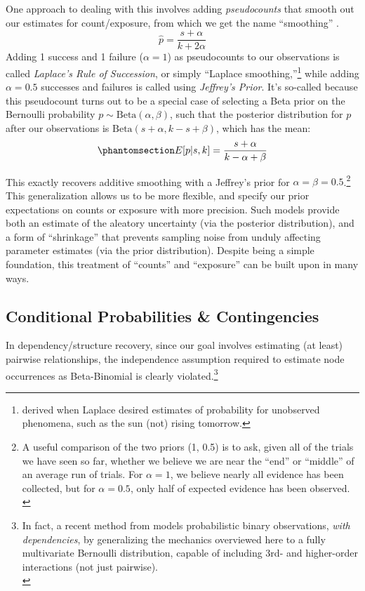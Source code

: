 \documentclass[%
	12pt,
		oneside,
		letterpaper
]{book}
\begin{document}
One approach to dealing with this involves adding \emph{pseudocounts} that smooth out our estimates for count/exposure, from which we get the name ``smoothing'' \autocite[45-53]{SpeechLanguageProcessing_Jurafsky2025}.
\[\hat{p} = \frac{s+\alpha}{k+2\alpha} \]
Adding 1 success and 1 failure (\(\alpha=1\)) as pseudocounts to our observations is called \emph{Laplace's Rule of Succession}, or simply ``Laplace smoothing,''\footnote{
  derived when Laplace desired estimates of probability for unobserved phenomena, such as the sun (not) rising tomorrow.} while adding \(\alpha=0.5\) successes and failures is called using \emph{Jeffrey's Prior}.
It's so-called because this pseudocount turns out to be a special case of selecting a Beta prior on the Bernoulli probability \(p\sim \textrm{Beta}(\alpha, \beta)\), such that the posterior distribution for \(p\) after our observations is \(\textrm{Beta}(s+\alpha, k-s+\beta)\), which has the mean:
\begin{equation}\phantomsection\label{eq-beta-binomial}{
E[p|s,k]=\frac{s+\alpha}{k-\alpha+\beta}
}\end{equation}

This exactly recovers additive smoothing with a Jeffrey's prior for \(\alpha=\beta=0.5\).\footnote{
  A useful comparison of the two priors (1, 0.5) is to ask, given all of the trials we have seen so far, whether we believe we are near the ``end'' or ``middle'' of an average run of trials.
  For \(\alpha=1\), we believe nearly all evidence has been collected, but for \(\alpha=0.5\), only half of expected evidence has been observed.\\
}
This generalization allows us to be more flexible, and specify our prior expectations on counts or exposure with more precision.
Such models provide both an estimate of the aleatory uncertainty (via the posterior distribution), and a form of ``shrinkage'' that prevents sampling noise from unduly affecting parameter estimates (via the prior distribution).
Despite being a simple foundation, this treatment of ``counts'' and ``exposure'' can be built upon in many ways.

\subsection{Conditional Probabilities \& Contingencies}\label{conditional-probabilities-contingencies}

In dependency/structure recovery, since our goal involves estimating (at least) pairwise relationships, the independence assumption required to estimate node occurrences as Beta-Binomial is clearly violated.\footnote{
  In fact, a recent method from \autocite{MultivariateBernoullidistribution_Dai2013} models probabilistic binary observations, \emph{with dependencies}, by generalizing the mechanics overviewed here to a fully multivariate Bernoulli distribution, capable of including 3rd- and higher-order interactions (not just pairwise).\\
}
\end{document}
